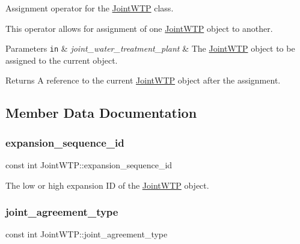 Assignment operator for the \mbox{\hyperlink{classJointWTP}{Joint\+W\+TP}} class. 

This operator allows for assignment of one {\ttfamily \mbox{\hyperlink{classJointWTP}{Joint\+W\+TP}}} object to another.


\begin{DoxyParams}[1]{Parameters}
\mbox{\tt in}  & {\em joint\+\_\+water\+\_\+treatment\+\_\+plant} & The {\ttfamily \mbox{\hyperlink{classJointWTP}{Joint\+W\+TP}}} object to be assigned to the current object.\\
\hline
\end{DoxyParams}
\begin{DoxyReturn}{Returns}
A reference to the current {\ttfamily \mbox{\hyperlink{classJointWTP}{Joint\+W\+TP}}} object after the assignment. 
\end{DoxyReturn}


\subsection{Member Data Documentation}
\mbox{\label{classJointWTP_a0e10a7f7ade04d5f3572f185de1b8653}} 
\subsubsection{\texorpdfstring{expansion\+\_\+sequence\+\_\+id}{expansion\_sequence\_id}}
{\footnotesize\ttfamily const int Joint\+W\+T\+P\+::expansion\+\_\+sequence\+\_\+id}



The low or high expansion ID of the \mbox{\hyperlink{classJointWTP}{Joint\+W\+TP}} object. 

\mbox{\label{classJointWTP_ac5663480c912b1b7cfdfb976b4fa3cec}} 
\subsubsection{\texorpdfstring{joint\+\_\+agreement\+\_\+type}{joint\_agreement\_type}}
{\footnotesize\ttfamily const int Joint\+W\+T\+P\+::joint\+\_\+agreement\+\_\+type}



